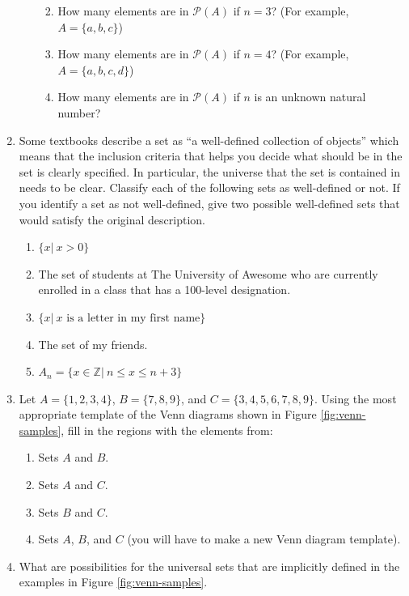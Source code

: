 \documentclass[
]{book}
\theoremstyle{definition}
\theoremstyle{definition}
\theoremstyle{definition}
\theoremstyle{definition}
\theoremstyle{remark}
\begin{document}
\begin{enumerate}
\begin{enumerate}
    \begin{enumerate}
    \def\labelenumiii{\roman{enumiii}.}
    \item
      How many elements are in \(\mathcal{P}(A)\) if \(n=3\)? (For example, \(A=\{a,b,c\}\))
    \item
      How many elements are in \(\mathcal{P}(A)\) if \(n=4\)? (For example, \(A=\{a,b,c,d\}\))
    \item
      How many elements are in \(\mathcal{P}(A)\) if \(n\) is an unknown natural number?
    \end{enumerate}
  \end{enumerate}
\item
  Some textbooks describe a set as ``a well-defined collection of objects'' which means that the inclusion criteria that helps you decide what should be in the set is clearly specified. In particular, the universe that the set is contained in needs to be clear. Classify each of the following sets as well-defined or not. If you identify a set as not well-defined, give two possible well-defined sets that would satisfy the original description.

  \begin{enumerate}
  \def\labelenumii{\alph{enumii}.}
  \item
    \(\{x \vert \: x>0\}\)
  \item
    The set of students at The University of Awesome who are currently enrolled in a class that has a 100-level designation.
  \item
    \(\{x\vert \: x \textrm{ is a letter in my first name}\}\)
  \item
    The set of my friends.
  \item
    \(A_n=\{x\in \mathbb{Z} \vert \: n\leq x\leq n+3\}\)
  \end{enumerate}
\item
  Let \(A=\{1, 2, 3, 4\}\), \(B=\{7,8,9\}\), and \(C=\{3,4,5,6,7,8,9\}\). Using the most appropriate template of the Venn diagrams shown in Figure \ref{fig:venn-samples}, fill in the regions with the elements from:

  \begin{enumerate}
  \def\labelenumii{\alph{enumii}.}
  \item
    Sets \(A\) and \(B\).
  \item
    Sets \(A\) and \(C\).
  \item
    Sets \(B\) and \(C\).
  \item
    Sets \(A\), \(B\), and \(C\) (you will have to make a new Venn diagram template).
  \end{enumerate}
\item
  What are possibilities for the universal sets that are implicitly defined in the examples in Figure \ref{fig:venn-samples}.
\end{enumerate}
\end{document}
